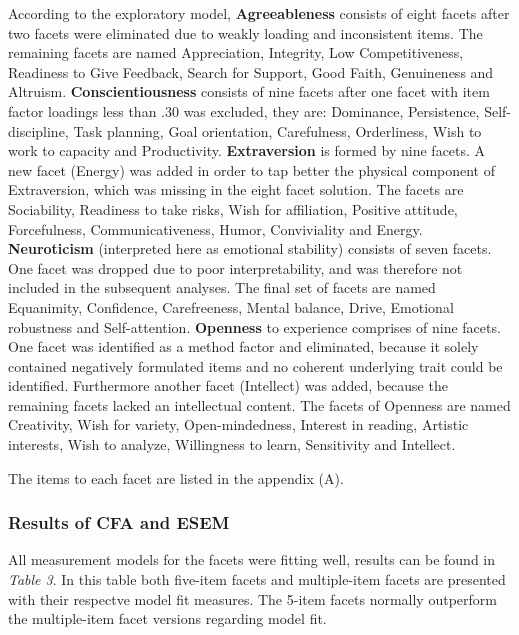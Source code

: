 \documentclass[man]{apa6}
\theoremstyle{definition}
\theoremstyle{definition}
\theoremstyle{definition}
\theoremstyle{remark}
\begin{document}
According to the exploratory model, \textbf{Agreeableness} consists of
eight facets after two facets were eliminated due to weakly loading and
inconsistent items. The remaining facets are named Appreciation,
Integrity, Low Competitiveness, Readiness to Give Feedback, Search for
Support, Good Faith, Genuineness and Altruism.
\textbf{Conscientiousness} consists of nine facets after one facet with
item factor loadings less than .30 was excluded, they are: Dominance,
Persistence, Self-discipline, Task planning, Goal orientation,
Carefulness, Orderliness, Wish to work to capacity and Productivity.
\textbf{Extraversion} is formed by nine facets. A new facet (Energy) was
added in order to tap better the physical component of Extraversion,
which was missing in the eight facet solution. The facets are
Sociability, Readiness to take risks, Wish for affiliation, Positive
attitude, Forcefulness, Communicativeness, Humor, Conviviality and
Energy. \textbf{Neuroticism} (interpreted here as emotional stability)
consists of seven facets. One facet was dropped due to poor
interpretability, and was therefore not included in the subsequent
analyses. The final set of facets are named Equanimity, Confidence,
Carefreeness, Mental balance, Drive, Emotional robustness and
Self-attention. \textbf{Openness} to experience comprises of nine
facets. One facet was identified as a method factor and eliminated,
because it solely contained negatively formulated items and no coherent
underlying trait could be identified. Furthermore another facet
(Intellect) was added, because the remaining facets lacked an
intellectual content. The facets of Openness are named Creativity, Wish
for variety, Open-mindedness, Interest in reading, Artistic interests,
Wish to analyze, Willingness to learn, Sensitivity and Intellect.

The items to each facet are listed in the appendix (A).

\hypertarget{results-of-cfa-and-esem}{%
\subsubsection{Results of CFA and ESEM}\label{results-of-cfa-and-esem}}

All measurement models for the facets were fitting well, results can be
found in \emph{Table 3}. In this table both five-item facets and
multiple-item facets are presented with their respectve model fit
measures. The 5-item facets normally outperform the multiple-item facet
versions regarding model fit.
\end{document}
